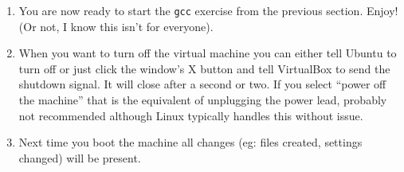 \documentclass{lab}
\begin{document}
\begin{enumerate}
\item You are now ready to start the \texttt{gcc} exercise from the previous section. Enjoy! (Or not, I know this isn't for everyone).

\item When you want to turn off the virtual machine you can either tell Ubuntu to turn off or just click the window's X button and tell VirtualBox to send the shutdown signal. It will close after a second or two. If you select ``power off the machine'' that is the equivalent of unplugging the power lead, probably not recommended although Linux typically handles this without issue.

\item Next time you boot the machine all changes (eg: files created, settings changed) will be present.

\end{enumerate}
\end{document}
